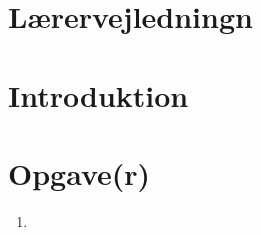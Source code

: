 \documentclass[a4paper,12pt]{article}
\title{\chess}
\author{Jon Sporring}
\begin{document}
\maketitle

\section{Lærervejledningn}

\section{Introduktion}

\section{Opgave(r)}
\begin{enumerate}
\item 
\end{enumerate}
\end{document}
